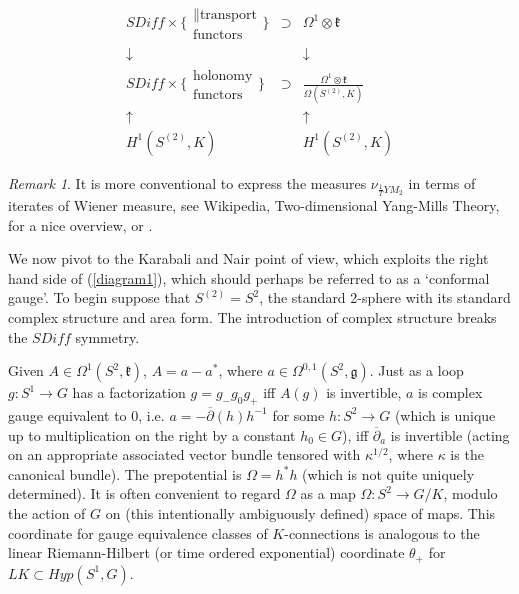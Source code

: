 \documentclass{amsart}
\theoremstyle{conjecture}
\theoremstyle{definition}
\theoremstyle{question}
\theoremstyle{questions}
\theoremstyle{remark}
\newtheorem*{remark}{Remark}
\theoremstyle{remarks}
\theoremstyle{example}
\numberwithin{equation}{section}
\begin{document}
\begin{equation}\begin{matrix} SDiff \times \{\begin{matrix}\parallel\text{transport}\\ \text{functors}\end{matrix}\}& \supset& \Omega^1\otimes \mathfrak k \\
\downarrow & &\downarrow \\
SDiff \times \{\begin{matrix}\text{holonomy}\\ \text{functors}\end{matrix}\} &  \supset&\frac{\Omega^1\otimes \mathfrak k}{\Omega(S^{(2)},K)}  \\ \uparrow & & \uparrow \\ H^1(S^{(2)},K) & &  H^1(S^{(2)},K)  \end{matrix}\end{equation}

\begin{remark}It is more conventional to express the measures $\nu_{\frac 1T YM_2}$ in terms of iterates of Wiener measure, see Wikipedia, Two-dimensional Yang-Mills Theory, for
a nice overview, or \cite{Sengupta}. 
\end{remark} 

We now pivot to the Karabali and Nair point of view, which exploits the right hand side of (\ref{diagram1}), which should perhaps be referred to as a `conformal gauge'. To begin suppose that $S^{(2)}=S^2$, the standard 2-sphere
with its standard complex structure and area form. The introduction of complex structure breaks the $SDiff$ symmetry.

Given $A\in \Omega^1(S^2,\mathfrak k)$, $A=a-a^*$, where $a\in \Omega^{0,1}(S^2,\mathfrak g)$. Just as a loop $g:S^1 \to G$ has 
a factorization $g=g_-g_0g_+$ iff $A(g)$ is invertible,
$a$ is complex gauge equivalent to 0, i.e. $a=-\overline{\partial}(h)h^{-1}$ for some $h:S^2\to G$ (which is unique up to multiplication on the right
by a constant $h_0\in G$), iff $\overline{\partial}_a$ is invertible (acting
on an appropriate associated vector bundle tensored with $\kappa^{1/2}$, where $\kappa$ is the canonical bundle). The
prepotential is $\Omega=h^*h$ (which is not quite uniquely determined). It is often convenient to regard $\Omega$ as a map $\Omega:S^2\to G/K$, modulo
the action of $G$ on (this intentionally ambiguously defined) space of maps. 
This coordinate for gauge equivalence classes of $K$-connections is analogous to the linear Riemann-Hilbert (or time ordered exponential)
coordinate $\theta_+$ for $LK\subset Hyp(S^1,G)$.
\end{document}
